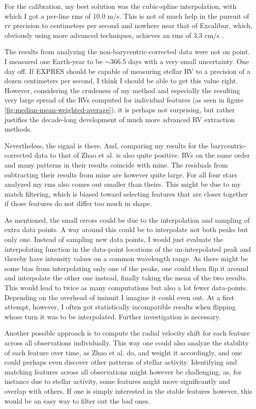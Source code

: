 
For the calibration, my best solution was the cubic-spline interpolation, with which I got a per-line rms of 10.0 m/s. This is not of much help in the pursuit of rv precision to centimeters per second and nowhere near that of Excalibur, which, obviously using more advanced techniques, achieves an rms of 3.3 cm/s \cite{zhao2021excalibur}.

The results from analyzing the non-barycentric-corrected data were not on point. I measured one Earth-year to be $\sim$366.5 days with a very small uncertainty. One day off. If EXPRES should be capable of measuring stellar RV to a precision of a dozen centimeters per second, I think I should be able to get this value right. However, considering the crudeness of my method and especially the resulting very large spread of the RVs computed for individual features (as seen in figure \ref{fig:median-mean-weighted-average}), it is perhaps not surprising, but rather justifies the decade-long development of much more advanced RV extraction methods.

Nevertheless, the signal is there. And, comparing my results for the barycentric-corrected data to that of Zhao et al. is also quite positive. RVs on the same order and many patterns in their results coincide with mine. The residuals from subtracting their results from mine are however quite large. For all four stars analyzed my rms also comes out smaller than theirs. This might be due to my match filtering, which is biased toward selecting features that are closer together if those features do not differ too much in shape.

As mentioned, the small errors could be due to the interpolation and sampling of extra data points. A way around this could be to interpolate not both peaks but only one. Instead of sampling new data points, I would just evaluate the interpolating function in the data-point locations of the un-interpolated peak and thereby have intensity values on a common wavelength range. As there might be some bias from interpolating only one of the peaks, one could then flip it around and interpolate the other one instead, finally taking the mean of the two results. This would lead to twice as many computations but also a lot fewer data-points. Depending on the overhead of iminuit I imagine it could even out. At a first attempt, however, I often got statistically incompatible results when flipping whose turn it was to be interpolated. Further investigation is necessary.

Another possible approach is to compute the radial velocity shift for each feature across all observations individually. This way one could also analyze the stability of each feature over time, as Zhao et al. do, and weight it accordingly, and one could perhaps even discover other patterns of stellar activity. Identifying and matching features across all observations might however be challenging, as, for instance due to stellar activity, some features might move significantly and overlap with others. If one is simply interested in the stable features however, this would be an easy way to filter out the bad ones. 

